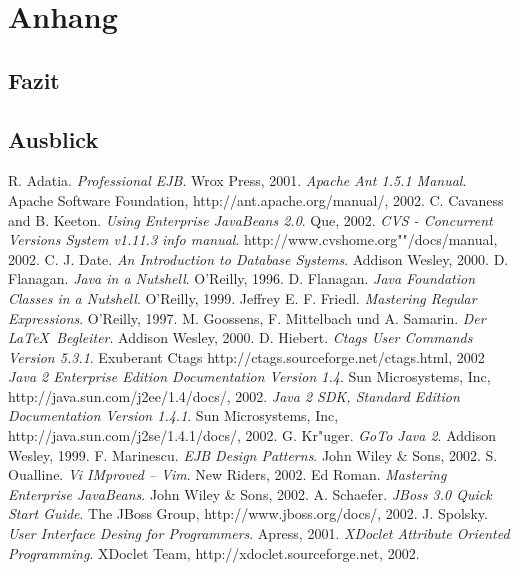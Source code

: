 
\chapter{Anhang}
\section{Fazit}
\section{Ausblick}



\begin{thebibliography}{keine ah}
\bibitem[Ada01]{} R. Adatia. \emph{Professional EJB}. Wrox Press, 2001.
\bibitem[Apa02]{} \emph{Apache Ant 1.5.1 Manual}. Apache Software Foundation, http://ant.apache.org/manual/, 2002.
\bibitem[Cav02]{} C. Cavaness and B. Keeton. \emph{Using Enterprise JavaBeans 2.0}. Que, 2002.
\bibitem[Cvs02]{} \emph{CVS - Concurrent Versions System v1.11.3 info manual}. http://www.cvshome.org""/docs/manual, 2002.
\bibitem[Dat00]{} C. J. Date. \emph{An Introduction to Database Systems}. Addison Wesley, 2000.
\bibitem[Fla96]{} D. Flanagan. \emph{Java in a Nutshell}. O'Reilly, 1996.
\bibitem[Fla99]{} D. Flanagan. \emph{Java Foundation Classes in a Nutshell}. O'Reilly, 1999.
\bibitem[Fri97]{} Jeffrey E. F. Friedl. \emph{Mastering Regular Expressions}. O'Reilly, 1997.
\bibitem[Goo00]{} M. Goossens, F. Mittelbach und A. Samarin. \emph{Der \LaTeX \ Begleiter}. Addison Wesley, 2000.
\bibitem[Hie02]{} D. Hiebert. \emph{Ctags User Commands Version 5.3.1}. Exuberant Ctags http://ctags.sourceforge.net/ctags.html, 2002
\bibitem[Jee02]{} \emph{Java 2 Enterprise Edition Documentation Version 1.4}.  Sun Microsystems, Inc, http://java.sun.com/j2ee/1.4/docs/, 2002.
\bibitem[Jse02]{} \emph{Java 2 SDK, Standard Edition Documentation Version 1.4.1}.  Sun Microsystems, Inc, http://java.sun.com/j2se/1.4.1/docs/, 2002.
\bibitem[Kr"u99]{} G. Kr"uger. \emph{GoTo Java 2}. Addison Wesley, 1999.
\bibitem[Mar02]{} F. Marinescu. \emph{EJB Design Patterns}. John Wiley \& Sons, 2002.
\bibitem[Oua02]{} S. Oualline. \emph{Vi IMproved -- Vim}. New Riders, 2002.
\bibitem[Rom02]{} Ed Roman. \emph{Mastering Enterprise JavaBeans}. John Wiley \& Sons, 2002.
\bibitem[Sch02]{} A. Schaefer. \emph{JBoss 3.0 Quick Start Guide}. The JBoss Group, http://www.jboss.org/docs/, 2002.
\bibitem[Spo01]{} J. Spolsky. \emph{User Interface Desing for Programmers}. Apress, 2001.
\bibitem[Xdo02]{} \emph{XDoclet Attribute Oriented Programming}. XDoclet Team, http://xdoclet.sourceforge.net, 2002.
\end{thebibliography}

